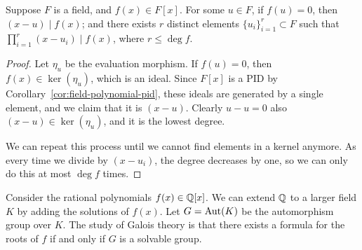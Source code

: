 \begin{theorem}
    Suppose \(F\) is a field, and \(f(x) \in F[x]\).
    For some \(u \in F\), if \(f(u) = 0\), then \((x-u) \mid f(x)\);
    and there exists \(r\) distinct elements \({\{u_i\}}_{i=1}^r \subset F\)
    such that \(\prod_{i=1}^r (x-u_i) \mid f(x)\),
    where \(r \leq \deg f\).
\end{theorem}
\begin{proof}
    Let \(\eta_u\) be the evaluation morphism.
    If \(f(u) = 0\), then \(f(x) \in \ker(\eta_u)\),
    which is an ideal.
    Since \(F[x]\) is a PID by Corollary~\ref{cor:field-polynomial-pid},
    these ideals are generated by a single element,
    and we claim that it is \((x-u)\).
    Clearly \(u-u = 0\) also \((x-u) \in \ker(\eta_u)\),
    and it is the lowest degree.

    We can repeat this process until we cannot find elements in a kernel anymore.
    As every time we divide by \((x-u_i)\),
    the degree decreases by one,
    so we can only do this at most \(\deg f\) times.
\end{proof}
\begin{remark}
    Consider the rational polynomials \(f(x) \in \mathbb{Q}[x]\).
    We can extend \(\mathbb{Q}\) to a larger field \(K\)
    by adding the solutions of \(f(x)\).
    Let \(G = \operatorname{Aut}(K)\) be the automorphism group over \(K\).
    The study of Galois theory is that there exists a formula
    for the roots of \(f\) if and only if \(G\) is a solvable group.
\end{remark}

